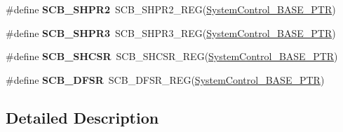 \begin{DoxyCompactItemize}
\item 
\hypertarget{group___s_c_b___register___accessor___macros_ga8ae524551cd0a9cee2b7e4484d926c5a}{}\#define {\bfseries S\+C\+B\+\_\+\+S\+H\+P\+R2}~S\+C\+B\+\_\+\+S\+H\+P\+R2\+\_\+\+R\+E\+G(\hyperlink{group___s_c_b___peripheral_gaf22864785770f832103e904244e078cb}{System\+Control\+\_\+\+B\+A\+S\+E\+\_\+\+P\+T\+R})\label{group___s_c_b___register___accessor___macros_ga8ae524551cd0a9cee2b7e4484d926c5a}

\item 
\hypertarget{group___s_c_b___register___accessor___macros_gac0a168427d861c6175c07a2da89bca40}{}\#define {\bfseries S\+C\+B\+\_\+\+S\+H\+P\+R3}~S\+C\+B\+\_\+\+S\+H\+P\+R3\+\_\+\+R\+E\+G(\hyperlink{group___s_c_b___peripheral_gaf22864785770f832103e904244e078cb}{System\+Control\+\_\+\+B\+A\+S\+E\+\_\+\+P\+T\+R})\label{group___s_c_b___register___accessor___macros_gac0a168427d861c6175c07a2da89bca40}

\item 
\hypertarget{group___s_c_b___register___accessor___macros_ga00f70fc0cb709999835d54fb1a8d4112}{}\#define {\bfseries S\+C\+B\+\_\+\+S\+H\+C\+S\+R}~S\+C\+B\+\_\+\+S\+H\+C\+S\+R\+\_\+\+R\+E\+G(\hyperlink{group___s_c_b___peripheral_gaf22864785770f832103e904244e078cb}{System\+Control\+\_\+\+B\+A\+S\+E\+\_\+\+P\+T\+R})\label{group___s_c_b___register___accessor___macros_ga00f70fc0cb709999835d54fb1a8d4112}

\item 
\hypertarget{group___s_c_b___register___accessor___macros_gae3a7746f39eaa9eb3cd867d1dc327c8b}{}\#define {\bfseries S\+C\+B\+\_\+\+D\+F\+S\+R}~S\+C\+B\+\_\+\+D\+F\+S\+R\+\_\+\+R\+E\+G(\hyperlink{group___s_c_b___peripheral_gaf22864785770f832103e904244e078cb}{System\+Control\+\_\+\+B\+A\+S\+E\+\_\+\+P\+T\+R})\label{group___s_c_b___register___accessor___macros_gae3a7746f39eaa9eb3cd867d1dc327c8b}

\end{DoxyCompactItemize}


\subsection{Detailed Description}

